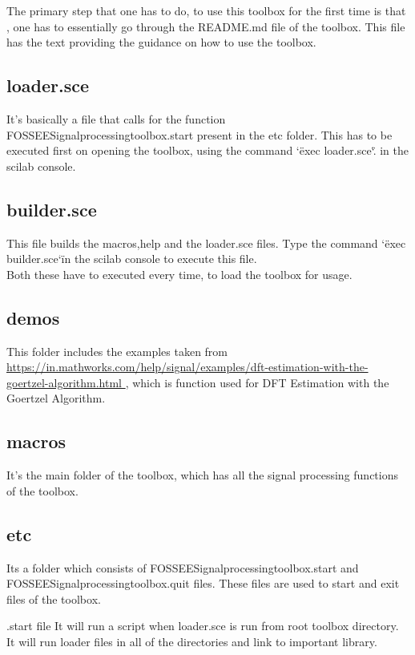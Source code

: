 \documentclass[12pt,a4paper]{report}
\begin{document}
The primary step that one has to do, to use this toolbox for the first time is that , one has to essentially go through the README.md file of the toolbox. This file has the text providing the guidance on how to use the toolbox.  

\subsection{loader.sce}
It’s basically a file that calls for the function FOSSEE\textunderscore Signal\textunderscore processing\textunderscore toolbox.start present in the etc folder. This has to be executed first on opening the toolbox, using the command \char`\"exec loader.sce\char`\".
in the scilab console.


\subsection{builder.sce}
This file builds the macros,help and the loader.sce files. Type the command \char`\"exec builder.sce\char`\" in the scilab console to execute this file.\\
Both these have to executed every time, to load the toolbox for usage.

\subsection{demos}
This folder includes the examples taken from  \url{https://in.mathworks.com/help/signal/examples/dft-estimation-with-the-goertzel-algorithm.html }, which is function used for DFT Estimation with the Goertzel Algorithm.

\subsection{macros}
It’s the main folder of the toolbox, which has all the signal processing functions of the toolbox.

\subsection{etc}
Its a folder which consists of FOSSEE\textunderscore Signal\textunderscore processing\textunderscore toolbox.start and FOSSEE\textunderscore Signal\textunderscore processing\textunderscore toolbox.quit files.
These files are used to start and exit files of the toolbox.

.start file
It will run a script when loader.sce is run from root toolbox directory. It will run loader files in all of the directories and link to important library.
\end{document}
